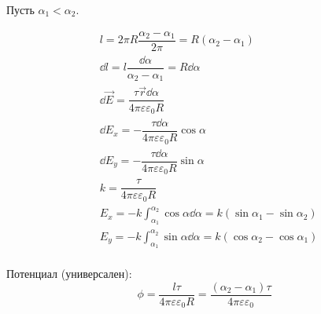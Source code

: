 \documentclass[12pt]{report}
\begin{document}
Пусть $\alpha_1 < \alpha_2$.

\begin{align*}
     & l = 2\pi R \dfrac{\alpha_2 - \alpha_1}{2\pi} = R(\alpha_2 - \alpha_1)                          \\
     & \dd l = l \dfrac{\dd \alpha}{\alpha_2 - \alpha_1} = R \dd \alpha                               \\
     & \dd \vec E = \dfrac{\tau \vec{r} \dd \alpha}{4 \pi \varepsilon \varepsilon_0 R}                \\
     & \dd E_x = -\dfrac{\tau \dd \alpha}{4 \pi \varepsilon \varepsilon_0 R} \cos \alpha              \\
     & \dd E_y = -\dfrac{\tau \dd \alpha}{4 \pi \varepsilon \varepsilon_0 R} \sin \alpha              \\
     & k = \dfrac{\tau}{4\pi \varepsilon \varepsilon_0 R}                                             \\
     & E_x = -k \int_{\alpha_1}^{\alpha_2} \cos \alpha \dd \alpha = k (\sin \alpha_1 - \sin \alpha_2) \\
     & E_y = -k \int_{\alpha_1}^{\alpha_2} \sin \alpha \dd \alpha = k (\cos \alpha_2 - \cos \alpha_1) \\
\end{align*}

Потенциал (универсален):
\[
    \phi = \dfrac{l \tau}{4\pi \varepsilon\varepsilon_0 R}
    = \dfrac{(\alpha_2 - \alpha_1)\tau}{4\pi \varepsilon\varepsilon_0}
\]
\end{document}
